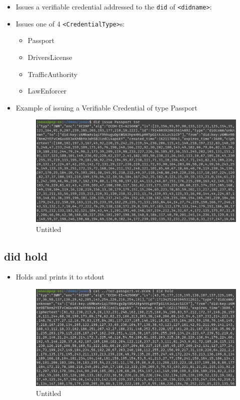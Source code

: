 \begin{itemize}
\item
  Issues a verifiable credential addressed to the
  \passthrough{\lstinline!did!} of \passthrough{\lstinline!<didname>!}:
\item
  Issues one of 4 \passthrough{\lstinline!<CredentialType>!}s:

  \begin{itemize}
  \tightlist
  \item
    Passport
  \item
    DriversLicense
  \item
    TrafficAuthority
  \item
    LawEnforcer
  \end{itemize}
\item
  Example of issuing a Verifiable Credential of type Passport

  \begin{figure}
  \centering
  \includegraphics{User Interface f8759a9462b24d5f95cf6123d68b89ea/Untitled 10.png}
  \caption{Untitled}
  \end{figure}
\end{itemize}

\hypertarget{did-hold}{%
\subsection{\texorpdfstring{did hold }{did hold }}\label{did-hold}}

\begin{itemize}
\item
  Holds and prints it to stdout

  \begin{figure}
  \centering
  \includegraphics{User Interface f8759a9462b24d5f95cf6123d68b89ea/Untitled 11.png}
  \caption{Untitled}
  \end{figure}
\end{itemize}


